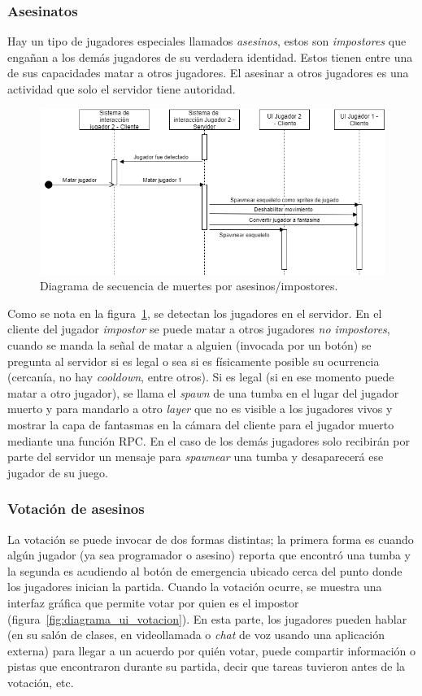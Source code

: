 \subsubsection{Asesinatos}
Hay un tipo de jugadores especiales llamados \textit{asesinos}, estos son \textit{impostores} que engañan a los demás jugadores de su verdadera identidad. Estos tienen entre una de sus capacidades matar a otros jugadores. El asesinar a otros jugadores es una actividad que solo el servidor tiene autoridad.

\begin{figure}[H]
    \centering
    \includegraphics[width=1\linewidth]{images/diagrama_sec_matar.png}
    \caption{Diagrama de secuencia de muertes por asesinos/impostores.}
    \label{fig:diagrama_sec_muertes_por_impost}
\end{figure}

Como se nota en la figura~\ref{fig:diagrama_sec_muertes_por_impost}, se detectan los jugadores en el servidor. En el cliente del jugador \textit{impostor} se puede matar a otros jugadores \textit{no impostores}, cuando se manda la señal de matar a alguien (invocada por un botón) se pregunta al servidor si es legal o sea si es físicamente posible su ocurrencia (cercanía, no hay \textit{cooldown}, entre otros). Si es legal (si en ese momento puede matar a otro jugador), se llama el \textit{spawn} de una tumba en el lugar del jugador muerto y para mandarlo a otro \textit{layer} que no es visible a los jugadores vivos y mostrar la capa de fantasmas en la cámara del cliente para el jugador muerto mediante una función RPC. En el caso de los demás jugadores solo recibirán por parte del servidor un mensaje para \textit{spawnear} una tumba y desaparecerá ese jugador de su juego.

\subsubsection{Votación de asesinos}
La votación se puede invocar de dos formas distintas; la primera forma es cuando algún jugador (ya sea programador o asesino) reporta que encontró una tumba y la segunda es acudiendo al botón de emergencia ubicado cerca del punto donde los jugadores inician la partida. Cuando la votación ocurre, se muestra una interfaz gráfica que permite votar por quien es el impostor (figura~\ref{fig:diagrama_ui_votacion}). En esta parte, los jugadores pueden hablar (en su salón de clases, en videollamada o \textit{chat} de voz usando una aplicación externa) para llegar a un acuerdo por quién votar, puede compartir información o pistas que encontraron durante su partida, decir que tareas tuvieron antes de la votación, etc. 

